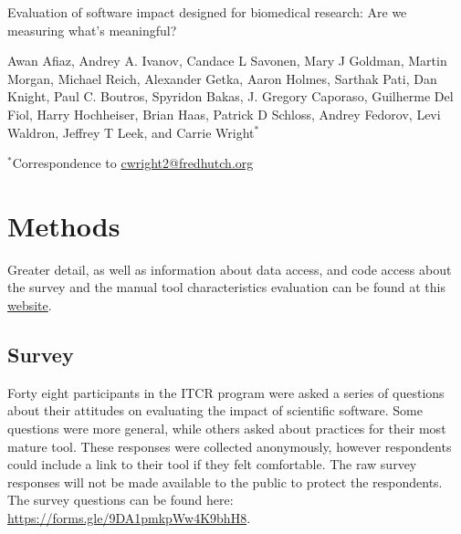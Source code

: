 \documentclass{article}
\begin{document}
\begin{center}

{\Large Evaluation of software impact designed for biomedical research: Are we measuring what's meaningful?}

\vspace*{0.75cm}

{\large Awan Afiaz, Andrey A. Ivanov, Candace L Savonen, Mary J Goldman, Martin Morgan, Michael Reich, Alexander Getka, Aaron Holmes, Sarthak Pati, Dan Knight, Paul C. Boutros, Spyridon
Bakas, J. Gregory Caporaso, Guilherme Del Fiol, Harry Hochheiser, Brian Haas,  Patrick D Schloss, Andrey Fedorov, Levi Waldron, Jeffrey T Leek, and Carrie Wright$^*$}

\vspace*{0.3cm}

{\small $^*$Correspondence to \url{cwright2@fredhutch.org}}

\end{center}

\renewcommand{\figurename}{Supplementary Figure}
\renewcommand{\tablename}{Supplementary Table}
\setcounter{figure}{0}
\setcounter{table}{0}
\setcounter{section}{0}
\setcounter{page}{1}
\makeatletter
\renewcommand{\thesection}{Supplemental Note S\@arabic\c@section}

\section{Methods}
\label{sec-supp-note-methods}

Greater detail, as well as information about data access, and code access about the survey and the manual tool characteristics evaluation can be found at this \href{https://hutchdatascience.org/ITCR_Metrics_manuscript_website/}{website}.

\subsection{Survey}
Forty eight participants in the ITCR program were asked a series of questions about their attitudes on evaluating the impact of scientific software. Some questions were more general, while others asked about practices for their most mature tool. These responses were collected anonymously, however respondents could include a link to their tool if they felt comfortable. The raw survey responses will not be made available to the public to protect the respondents. The survey questions can be found here: \url{https://forms.gle/9DA1pmkpWw4K9bhH8}.
\end{document}
